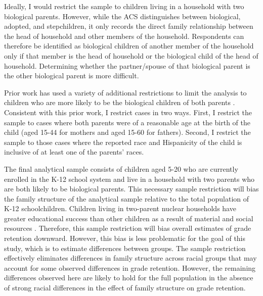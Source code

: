 \documentclass[
  12pt,
  letterpaper,
]{article}
\begin{document}
Ideally, I would restrict the sample to children living in a household
with two biological parents. However, while the ACS distinguishes
between biological, adopted, and stepchildren, it only records the
direct family relationship between the head of household and other
members of the household. Respondents can therefore be identified as
biological children of another member of the household only if that
member is the head of household or the biological child of the head of
household. Determining whether the partner/spouse of that biological
parent is the other biological parent is more difficult.

Prior work has used a variety of additional restrictions to limit the
analysis to children who are more likely to be the biological children
of both parents \autocite{saenz_persistence_1995,xie_racial_1997}.
Consistent with this prior work, I restrict cases in two ways. First, I
restrict the sample to cases where both parents were of a reasonable age
at the birth of the child (aged 15-44 for mothers and aged 15-60 for
fathers). Second, I restrict the sample to those cases where the
reported race and Hispanicity of the child is inclusive of at least one
of the parents' races.

The final analytical sample consists of children aged 5-20 who are
currently enrolled in the K-12 school system and live in a household
with two parents who are both likely to be biological parents. This
necessary sample restriction will bias the family structure of the
analytical sample relative to the total population of K-12
schoolchildren. Children living in two-parent nuclear households have
greater educational success than other children as a result of material
and social resources \autocite{biblarz_family_1999}. Therefore, this
sample restriction will bias overall estimates of grade retention
downward. However, this bias is less problematic for the goal of this
study, which is to estimate differences between groups. The sample
restriction effectively eliminates differences in family structure
across racial groups that may account for some observed differences in
grade retention. However, the remaining differences observed here are
likely to hold for the full population in the absence of strong racial
differences in the effect of family structure on grade retention.
\end{document}
